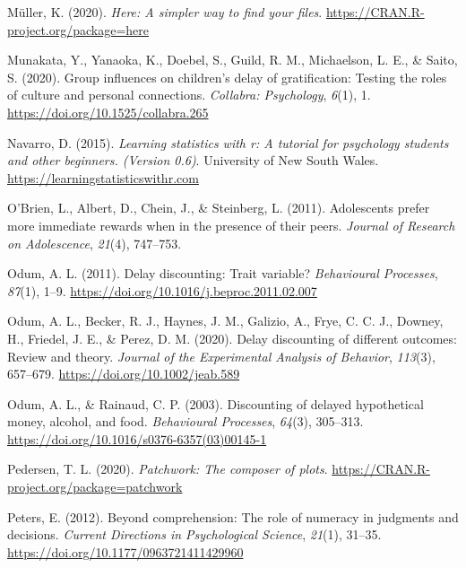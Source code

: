 \documentclass[
  pub,floatsintext]{apa6}
\newlength{\cslhangindent}
\newlength{\cslentryspacingunit} %
\newenvironment{CSLReferences}[2] %
 {%
  \setlength{\parindent}{0pt}
  \ifodd #1
  \let\oldpar\par
  \def\par{\hangindent=\cslhangindent\oldpar}
  \fi
  \setlength{\parskip}{#2\cslentryspacingunit}
 }%
 {}
\begin{document}
\begin{CSLReferences}{1}{0}
\leavevmode{}%
Müller, K. (2020). \emph{Here: A simpler way to find your files}. \url{https://CRAN.R-project.org/package=here}

\leavevmode{}%
Munakata, Y., Yanaoka, K., Doebel, S., Guild, R. M., Michaelson, L. E., \& Saito, S. (2020). Group influences on children's delay of gratification: {Testing} the roles of culture and personal connections. \emph{Collabra: Psychology}, \emph{6}(1), 1. \url{https://doi.org/10.1525/collabra.265}

\leavevmode{}%
Navarro, D. (2015). \emph{Learning statistics with r: A tutorial for psychology students and other beginners. (Version 0.6)}. University of New South Wales. \url{https://learningstatisticswithr.com}

\leavevmode{}%
O'Brien, L., Albert, D., Chein, J., \& Steinberg, L. (2011). Adolescents prefer more immediate rewards when in the presence of their peers. \emph{Journal of Research on Adolescence}, \emph{21}(4), 747--753.

\leavevmode{}%
Odum, A. L. (2011). Delay discounting: {Trait} variable? \emph{Behavioural Processes}, \emph{87}(1), 1--9. \url{https://doi.org/10.1016/j.beproc.2011.02.007}

\leavevmode{}%
Odum, A. L., Becker, R. J., Haynes, J. M., Galizio, A., Frye, C. C. J., Downey, H., Friedel, J. E., \& Perez, D. M. (2020). Delay discounting of different outcomes: {Review} and theory. \emph{Journal of the Experimental Analysis of Behavior}, \emph{113}(3), 657--679. \url{https://doi.org/10.1002/jeab.589}

\leavevmode{}%
Odum, A. L., \& Rainaud, C. P. (2003). Discounting of delayed hypothetical money, alcohol, and food. \emph{Behavioural Processes}, \emph{64}(3), 305--313. \url{https://doi.org/10.1016/s0376-6357(03)00145-1}

\leavevmode{}%
Pedersen, T. L. (2020). \emph{Patchwork: The composer of plots}. \url{https://CRAN.R-project.org/package=patchwork}

\leavevmode{}%
Peters, E. (2012). Beyond comprehension: {The} role of numeracy in judgments and decisions. \emph{Current Directions in Psychological Science}, \emph{21}(1), 31--35. \url{https://doi.org/10.1177/0963721411429960}


\end{CSLReferences}
\end{document}
